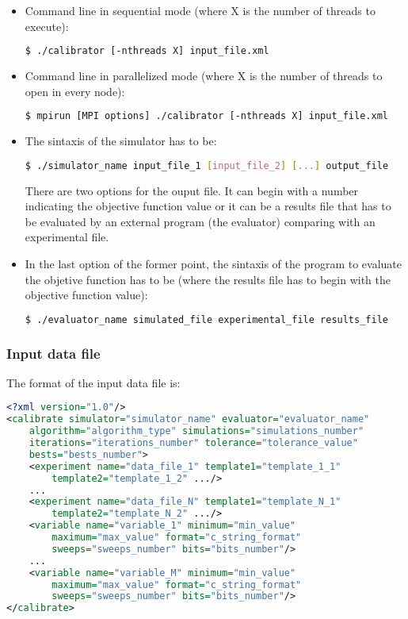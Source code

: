 \documentclass[review,authoryear]{elsarticle}
\begin{document}
\begin{itemize}

\item Command line in sequential mode (where X is the number of threads to
execute):
\begin{lstlisting}[language=bash,basicstyle=\scriptsize]
$ ./calibrator [-nthreads X] input_file.xml
\end{lstlisting}

\item Command line in parallelized mode (where X is the number of threads to
open in every node):
\begin{lstlisting}[language=bash,basicstyle=\scriptsize]
$ mpirun [MPI options] ./calibrator [-nthreads X] input_file.xml
\end{lstlisting}

\item The sintaxis of the simulator has to be:
\begin{lstlisting}[language=bash,basicstyle=\scriptsize]
$ ./simulator_name input_file_1 [input_file_2] [...] output_file
\end{lstlisting}
There are two options for the ouput file. It can begin with a number indicating
the objective function value or it can be a results file that has to be
evaluated by an external program (the evaluator) comparing with an experimental
file.

\item In the last option of the former point, the sintaxis of the program to
evaluate the objetive function has to be (where the results file has to begin
with the objective function value):
\begin{lstlisting}[language=bash,basicstyle=\scriptsize]
$ ./evaluator_name simulated_file experimental_file results_file
\end{lstlisting}

\end{itemize}

\subsubsection{Input data file}

The format of the input data file is:
\begin{lstlisting}[language=xml,basicstyle=\scriptsize]
<?xml version="1.0"/>
<calibrate simulator="simulator_name" evaluator="evaluator_name"
	algorithm="algorithm_type" simulations="simulations_number"
	iterations="iterations_number" tolerance="tolerance_value"
	bests="bests_number">
	<experiment name="data_file_1" template1="template_1_1"
		template2="template_1_2" .../>
	...
	<experiment name="data_file_N" template1="template_N_1"
		template2="template_N_2" .../>
	<variable name="variable_1" minimum="min_value"
		maximum="max_value" format="c_string_format"
		sweeps="sweeps_number" bits="bits_number"/>
	...
	<variable name="variable_M" minimum="min_value"
		maximum="max_value" format="c_string_format"
		sweeps="sweeps_number" bits="bits_number"/>
</calibrate>
\end{lstlisting}
\end{document}

